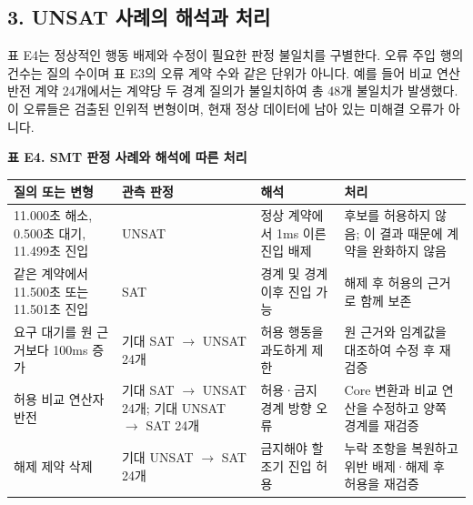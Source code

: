 \documentclass[11pt,a4paper]{article}
\begin{document}
\subsection*{3. UNSAT 사례의 해석과 처리}

표 E4는 정상적인 행동 배제와 수정이 필요한 판정 불일치를 구별한다. 오류 주입 행의 건수는 질의 수이며 표 E3의 오류 계약 수와 같은 단위가 아니다. 예를 들어 비교 연산 반전 계약 24개에서는 계약당 두 경계 질의가 불일치하여 총 48개 불일치가 발생했다. 이 오류들은 검출된 인위적 변형이며, 현재 정상 데이터에 남아 있는 미해결 오류가 아니다.\par

\par\medskip\noindent\begin{minipage}{\linewidth}
\textbf{표 E4. SMT 판정 사례와 해석에 따른 처리}\par

\par\medskip\noindent\begin{minipage}{\linewidth}\small
\begin{tabular}{@{}>{\raggedright\arraybackslash}p{}>{\raggedright\arraybackslash}p{}>{\raggedright\arraybackslash}p{}>{\raggedright\arraybackslash}p{}@{}}
\toprule
\textbf{질의 또는 변형} & \textbf{관측 판정} & \textbf{해석} & \textbf{처리} \\
\midrule
11.000초 해소, 0.500초 대기, 11.499초 진입 & UNSAT & 정상 계약에서 1ms 이른 진입 배제 & 후보를 허용하지 않음; 이 결과 때문에 계약을 완화하지 않음 \\
같은 계약에서 11.500초 또는 11.501초 진입 & SAT & 경계 및 경계 이후 진입 가능 & 해제 후 허용의 근거로 함께 보존 \\
요구 대기를 원 근거보다 100ms 증가 & 기대 SAT \ensuremath{\rightarrow} UNSAT 24개 & 허용 행동을 과도하게 제한 & 원 근거와 임계값을 대조하여 수정 후 재검증 \\
허용 비교 연산자 반전 & 기대 SAT \ensuremath{\rightarrow} UNSAT 24개; 기대 UNSAT \ensuremath{\rightarrow} SAT 24개 & 허용·금지 경계 방향 오류 & Core 변환과 비교 연산을 수정하고 양쪽 경계를 재검증 \\
해제 제약 삭제 & 기대 UNSAT \ensuremath{\rightarrow} SAT 24개 & 금지해야 할 조기 진입 허용 & 누락 조항을 복원하고 위반 배제·해제 후 허용을 재검증 \\
\bottomrule\end{tabular}\end{minipage}\par\medskip
\end{minipage}\par\medskip
\end{document}
